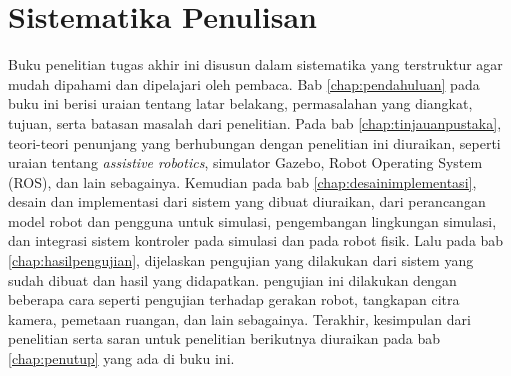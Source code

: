 \section{Sistematika Penulisan}
\label{sec:sistematikapenulisan}

Buku penelitian tugas akhir ini disusun dalam sistematika yang terstruktur agar mudah dipahami dan dipelajari oleh pembaca.
Bab \ref{chap:pendahuluan} pada buku ini berisi uraian tentang latar belakang, permasalahan yang diangkat, tujuan, serta batasan masalah dari penelitian.
Pada bab \ref{chap:tinjauanpustaka}, teori-teori penunjang yang berhubungan dengan penelitian ini diuraikan,
  seperti uraian tentang \emph{assistive robotics}, simulator Gazebo, Robot Operating System (ROS),
  dan lain sebagainya.
Kemudian pada bab \ref{chap:desainimplementasi}, desain dan implementasi dari sistem yang dibuat diuraikan,
  dari perancangan model robot dan pengguna untuk simulasi, pengembangan lingkungan simulasi,
  dan integrasi sistem kontroler pada simulasi dan pada robot fisik.
Lalu pada bab \ref{chap:hasilpengujian}, dijelaskan pengujian yang dilakukan dari sistem yang sudah dibuat dan hasil yang didapatkan.
pengujian ini dilakukan dengan beberapa cara seperti pengujian terhadap gerakan robot,
  tangkapan citra kamera, pemetaan ruangan, dan lain sebagainya.
Terakhir, kesimpulan dari penelitian serta saran untuk penelitian berikutnya diuraikan pada bab \ref{chap:penutup} yang ada di buku ini.
